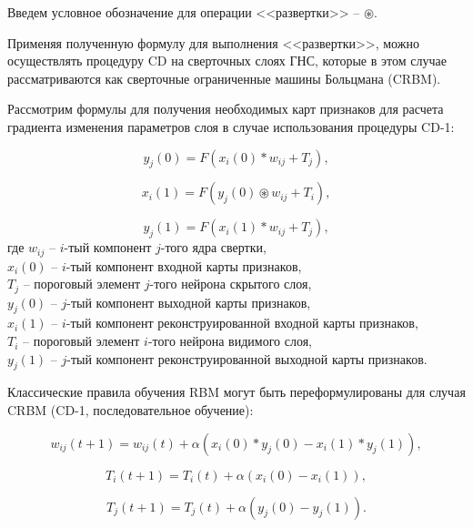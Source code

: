 Введем условное обозначение для операции <<развертки>> -- $\circledast$.

Применяя полученную формулу для выполнения <<развертки>>, можно осуществлять процедуру CD на сверточных слоях ГНС, которые в этом случае рассматриваются как сверточные ограниченные машины Больцмана (CRBM). 

Рассмотрим формулы для получения необходимых карт признаков для расчета градиента изменения параметров слоя в случае использования процедуры CD-1: 

\begin{equation*}
    y_j(0) = F(x_i(0) * w_{ij} + T_j),
\end{equation*}

\begin{equation*}
    x_i(1) = F(y_j(0) \circledast w_{ij} + T_i),
\end{equation*}

\begin{equation*}
    y_j(1) = F(x_i(1) * w_{ij} + T_j),
\end{equation*}
где $w_{ij}$ -- $i$-тый компонент $j$-того ядра свертки,\\
$x_i(0)$ -- $i$-тый компонент входной карты признаков,\\
$T_j$ -- пороговый элемент $j$-того нейрона скрытого слоя,\\
$y_j(0)$ -- $j$-тый компонент выходной карты признаков,\\
$x_i(1)$ -- $i$-тый компонент реконструированной входной карты признаков,\\
$T_i$ -- пороговый элемент $i$-того нейрона видимого слоя,\\
$y_j(1)$ -- $j$-тый компонент реконструированной выходной карты признаков.

Классические правила обучения RBM могут быть переформулированы для случая CRBM (CD-1, последовательное обучение): 

\begin{equation*}
		w_{ij}(t+1)=w_{ij}(t)+\alpha(x_i(0) * y_j(0)-x_i(1) * y_j(1)),
\end{equation*} 

\begin{equation*}	
		T_i(t+1)=T_i(t)+\alpha(x_i(0)-x_i(1)),
\end{equation*} 

\begin{equation*}		
		T_j(t+1)=T_j(t)+\alpha(y_j(0)-y_j(1)).
\end{equation*}


